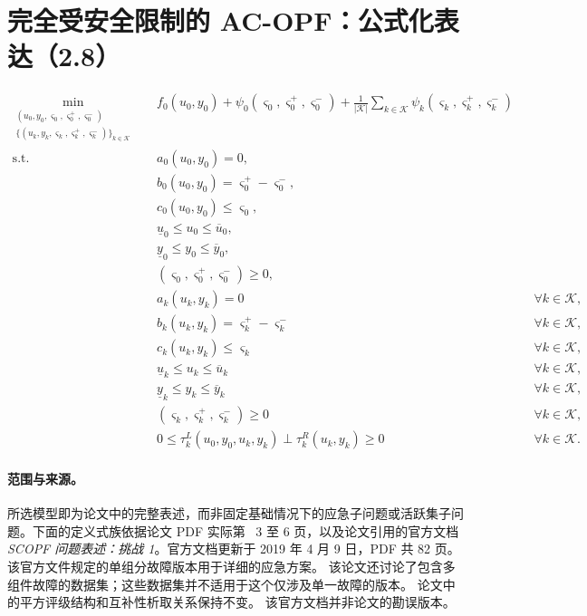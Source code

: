 \documentclass{article}
\begin{document}
\section*{完全受安全限制的 AC-OPF：公式化表达（2.8）}
\begin{equation}\tag{2.8}
\begin{aligned}
\min_{\substack{(u_0,y_0,\varsigma_0,\varsigma_0^+,\varsigma_0^-)\\
\{(u_k,y_k,\varsigma_k,\varsigma_k^+,\varsigma_k^-)\}_{k\in\mathcal K}}}
\quad &f_0(u_0,y_0)+\psi_0(\varsigma_0,\varsigma_0^+,\varsigma_0^-)
+\frac{1}{|\mathcal K|}\sum_{k\in\mathcal K}\psi_k(\varsigma_k,\varsigma_k^+,\varsigma_k^-)\\
\mathrm{s.t.}\quad
&a_0(u_0,y_0)=0,\\
&b_0(u_0,y_0)=\varsigma_0^+-\varsigma_0^-,\\
&c_0(u_0,y_0)\leq\varsigma_0,\\
&\underline u_0\leq u_0\leq\overline u_0,\\
&\underline y_0\leq y_0\leq\overline y_0,\\
&(\varsigma_0,\varsigma_0^+,\varsigma_0^-)\geq0,\\
&a_k(u_k,y_k)=0 &&\forall k\in\mathcal K,\\
&b_k(u_k,y_k)=\varsigma_k^+-\varsigma_k^- &&\forall k\in\mathcal K,\\
&c_k(u_k,y_k)\leq\varsigma_k &&\forall k\in\mathcal K,\\
&\underline u_k\leq u_k\leq\overline u_k &&\forall k\in\mathcal K,\\
&\underline y_k\leq y_k\leq\overline y_k &&\forall k\in\mathcal K,\\
&(\varsigma_k,\varsigma_k^+,\varsigma_k^-)\geq0 &&\forall k\in\mathcal K,\\
&0\leq\tau_k^L(u_0,y_0,u_k,y_k)\perp\tau_k^R(u_k,y_k)\geq0
&&\forall k\in\mathcal K.
\end{aligned}
\end{equation}

\paragraph{范围与来源。}
所选模型即为论文中的完整表述，而非固定基础情况下的应急子问题或活跃集子问题。下面的定义式族依据论文 PDF 实际第 ~3 至 6 页，以及论文引用的官方文档 \emph{SCOPF 问题表述：挑战 1}。官方文档更新于 2019 年 4 月 9 日，PDF 共 82 页。 该官方文件规定的单组分故障版本用于详细的应急方案。 该论文还讨论了包含多组件故障的数据集；这些数据集并不适用于这个仅涉及单一故障的版本。 论文中的平方评级结构和互补性析取关系保持不变。 该官方文档并非论文的勘误版本。
\end{document}
